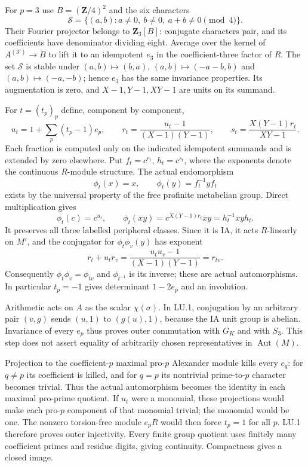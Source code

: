 For $p=3$ use $B=(\mathbf Z/4)^2$ and the six characters
\[
 \mathcal S=\{(a,b):a\ne0,\ b\ne0,\ a+b\ne0\pmod4\}.
\]
Their Fourier projector belongs to $\mathbf Z_3[B]$: conjugate
characters pair, and its coefficients have denominator dividing
eight. Average over the kernel of $A^{(3')}\to B$ to lift it
to an idempotent $e_3$ in the coefficient-three factor of $R$.
The set $\mathcal S$ is stable under $(a,b)\mapsto(b,a)$,
$(a,b)\mapsto(-a-b,b)$ and $(a,b)\mapsto(-a,-b)$; hence $e_3$
has the same invariance properties. Its augmentation is zero,
and $X-1,Y-1,XY-1$ are units on its summand.

For $t=(t_p)_p$ define, component by component,
\[
 u_t=1+\sum_p(t_p-1)e_p,\qquad
 r_t=\frac{u_t-1}{(X-1)(Y-1)},\qquad
 s_t=\frac{X(Y-1)r_t}{XY-1}.
\]
Each fraction is computed only on the indicated idempotent
summands and is extended by zero elsewhere. Put
$f_t=c^{r_t}$, $h_t=c^{s_t}$, where the exponents denote the
continuous $R$-module structure. The actual endomorphism
\[
 \phi_t(x)=x,\qquad \phi_t(y)=f_t^{-1}yf_t
\]
exists by the universal property of the free profinite
metabelian group. Direct multiplication gives
\[
 \phi_t(c)=c^{u_t},\qquad
 \phi_t(xy)=c^{X(Y-1)r_t}xy=h_t^{-1}xyh_t.
\]
It preserves all three labelled peripheral classes. Since it
is IA, it acts $R$-linearly on $M'$, and the conjugator for
$\phi_t\phi_v(y)$ has exponent
\[
 r_t+u_tr_v
   =\frac{u_tu_v-1}{(X-1)(Y-1)}=r_{tv}.
\]
Consequently $\phi_t\phi_v=\phi_{tv}$ and $\phi_{t^{-1}}$
is its inverse; these are actual automorphisms. In particular
$t_p=-1$ gives determinant $1-2e_p$ and an involution.

Arithmetic acts on $A$ as the scalar $\chi(\sigma)$. In LU.1,
conjugation by an arbitrary pair $(v,g)$ sends $(u,1)$ to
$(g(u),1)$, because the IA unit group is abelian. Invariance
of every $e_p$ thus proves outer commutation with $G_K$ and
with $S_3$. This step does not assert equality of arbitrarily
chosen representatives in $\operatorname{Aut}(M)$.

Projection to the coefficient-$p$ maximal pro-$p$ Alexander
module kills every $e_q$: for $q\ne p$ its coefficient is
killed, and for $q=p$ its nontrivial prime-to-$p$ character
becomes trivial. Thus the actual automorphism becomes the
identity in each maximal pro-prime quotient. If $u_t$ were a
monomial, these projections would make each pro-$p$ component
of that monomial trivial; the monomial would be one. The
nonzero torsion-free module $e_pR$ would then force $t_p=1$
for all $p$. LU.1 therefore proves outer injectivity. Every
finite group quotient uses finitely many coefficient primes
and residue digits, giving continuity. Compactness gives a
closed image.

